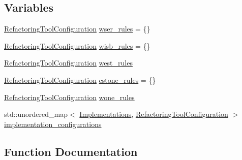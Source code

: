 \subsection*{Variables}
\begin{DoxyCompactItemize}
\item 
\mbox{\hyperlink{classws2st_1_1refactor_1_1RefactoringToolConfiguration}{Refactoring\+Tool\+Configuration}} \mbox{\hyperlink{namespacews2st_1_1refactor_1_1config_adbf1382f32e8457bc03111d509edbca6}{wser\+\_\+rules}} = \{\}
\item 
\mbox{\hyperlink{classws2st_1_1refactor_1_1RefactoringToolConfiguration}{Refactoring\+Tool\+Configuration}} \mbox{\hyperlink{namespacews2st_1_1refactor_1_1config_afdd469e55a65ac7c72071bf2e4e06029}{wisb\+\_\+rules}} = \{\}
\item 
\mbox{\hyperlink{classws2st_1_1refactor_1_1RefactoringToolConfiguration}{Refactoring\+Tool\+Configuration}} \mbox{\hyperlink{namespacews2st_1_1refactor_1_1config_a3dc95eea18c957b3983f70d23ffed2d0}{west\+\_\+rules}}
\item 
\mbox{\hyperlink{classws2st_1_1refactor_1_1RefactoringToolConfiguration}{Refactoring\+Tool\+Configuration}} \mbox{\hyperlink{namespacews2st_1_1refactor_1_1config_acb4294be20659997c85738666c145e94}{cstone\+\_\+rules}} = \{\}
\item 
\mbox{\hyperlink{classws2st_1_1refactor_1_1RefactoringToolConfiguration}{Refactoring\+Tool\+Configuration}} \mbox{\hyperlink{namespacews2st_1_1refactor_1_1config_a47b29102072b952b56dc5746d166da8c}{wone\+\_\+rules}}
\item 
std\+::unordered\+\_\+map$<$ \mbox{\hyperlink{common_8hpp_aad9d1428f17c06ff77ef15dea22624dc}{Implementations}}, \mbox{\hyperlink{classws2st_1_1refactor_1_1RefactoringToolConfiguration}{Refactoring\+Tool\+Configuration}} $>$ \mbox{\hyperlink{namespacews2st_1_1refactor_1_1config_aec45ab9284bf3a1ad930abb0fa522c25}{implementation\+\_\+configurations}}
\end{DoxyCompactItemize}


\subsection{Function Documentation}
\mbox{\label{namespacews2st_1_1refactor_1_1config_a0fc0edc6c85a212d9a53d019ac66844d}} 
